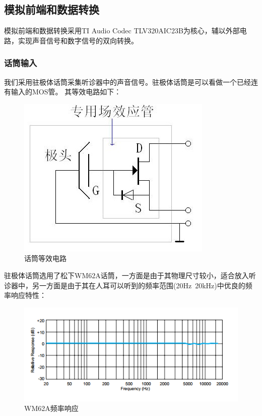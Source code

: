 \documentclass[16pt,a4paper]{article}
\begin{document}
\subsection{模拟前端和数据转换}
模拟前端和数据转换采用TI Audio Codec TLV320AIC23B为核心，辅以外部电路，实现声音信号和数字信号的双向转换。

\subsubsection{话筒输入}

我们采用驻极体话筒采集听诊器中的声音信号。驻极体话筒是可以看做一个已经连有输入的MOS管。
其等效电路如下：

\begin{figure}[H]
\centering
\includegraphics[scale = 0.5]{mic.jpg}
\caption{话筒等效电路} 
\end{figure}

驻极体话筒选用了松下WM62A话筒，一方面是由于其物理尺寸较小，适合放入听诊器中，另一方面是由于其在人耳可以听到的频率范围(20Hz~20kHz)中优良的频率响应特性：

\begin{figure}[H]
\centering
\includegraphics[scale = 1]{MICFR.png}
\caption{WM62A频率响应} 
\end{figure}
\end{document}
